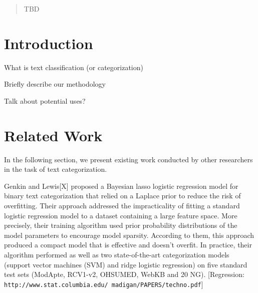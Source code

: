 \documentclass{acm_proc_article-sp}
\begin{document}
\date{30 July 1999}

\maketitle
\begin{abstract}
TBD
\end{abstract}

%
%

\section{Introduction}
What is text classification (or categorization)

Briefly describe our methodology

Talk about potential uses?





\section{Related Work}
In the following section, we present existing work conducted by other researchers in the task of text categorization.

Genkin and Lewis[X] proposed a Bayesian lasso logistic regression model for binary text categorization that relied on a Laplace prior to reduce the risk of overfitting. Their approach addressed the impracticality of fitting a standard logistic regression model to a dataset containing a large feature space. More precisely, their training algorithm used prior probability distributions of the model parameters to encourage model sparsity. According to them, this approach produced a compact model that is effective and doesn’t overfit. In practice, their algorithm performed as well as two state-of-the-art categorization models (support vector machines (SVM) and ridge logistic regression) on five standard test sets (ModApte, RCV1-v2, OHSUMED, WebKB and 20 NG).  [Regression: \texttt{http://www.stat.columbia.edu/~madigan/PAPERS/techno.pdf}]
\end{document}
